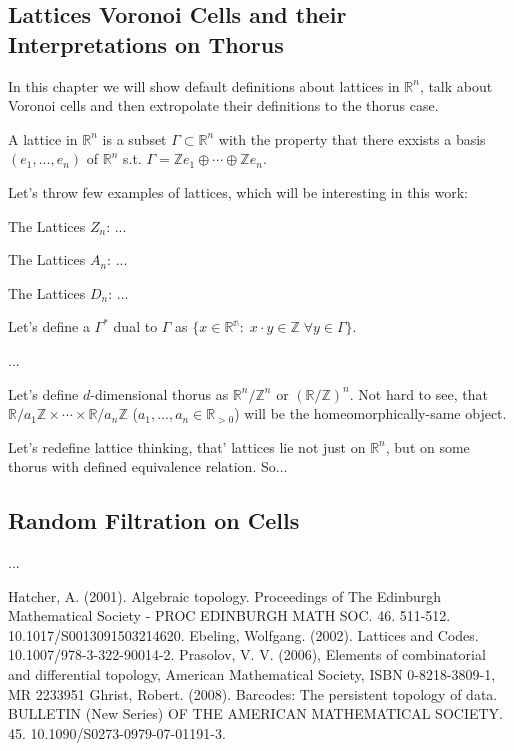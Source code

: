 \documentclass[a4paper, 12pt]{article}
\begin{document}
\subsection{Lattices Voronoi Cells and their Interpretations on Thorus}
\par In this chapter we will show default definitions about lattices in $\mathbb{R}^n$, talk about Voronoi cells and then extropolate their definitions to the thorus case. 
\par A lattice in $\mathbb{R}^n$ is a subset $\Gamma\subset\mathbb{R}^n$ with the property that there exxists a basis $(e_1, ..., e_n)$ of $\mathbb{R}^n$ s.t. $\Gamma = \mathbb{Z}e_1 \oplus\cdots\oplus \mathbb{Z}e_n$. \cite{ebeling}
\par Let's throw few examples of lattices, which will be interesting in this work:
\par The Lattices $Z_n$: ...
\par The Lattices $A_n$: ...
\par The Lattices $D_n$: ...

\par Let's define a $\Gamma^*$ dual to $\Gamma$ as $\{x\in\mathbb{R^n} :\; x\cdot y\in\mathbb{Z} \; \forall y\in\Gamma\}$.
\par ...

\par Let's define $d$-dimensional thorus as $\mathbb{R}^n/\mathbb{Z}^n$ or $\left(\mathbb{R}/\mathbb{Z}\right)^n$. Not hard to see, that $\mathbb{R}/a_1\mathbb{Z}\times\cdots\times\mathbb{R}/a_n\mathbb{Z}$ ($a_1,..., a_n\in\mathbb{R}_{>0}$) will be the homeomorphically-same object.
\par Let's redefine lattice thinking, that' lattices lie not just on $\mathbb{R}^n$, but on some thorus with defined equivalence relation. So...

\subsection{Random Filtration on Cells}
\par ...



\begin{thebibliography}{}
 Hatcher, A. (2001). Algebraic topology. Proceedings of The Edinburgh Mathematical Society - PROC EDINBURGH MATH SOC. 46. 511-512. 10.1017/S0013091503214620. 
 Ebeling, Wolfgang. (2002). Lattices and Codes. 10.1007/978-3-322-90014-2.
  Prasolov, V. V. (2006), Elements of combinatorial and differential topology, American Mathematical Society, ISBN 0-8218-3809-1, MR 2233951
 Ghrist, Robert. (2008). Barcodes: The persistent topology of data. BULLETIN (New Series) OF THE AMERICAN MATHEMATICAL SOCIETY. 45. 10.1090/S0273-0979-07-01191-3. 
\end{thebibliography}
\end{document}
